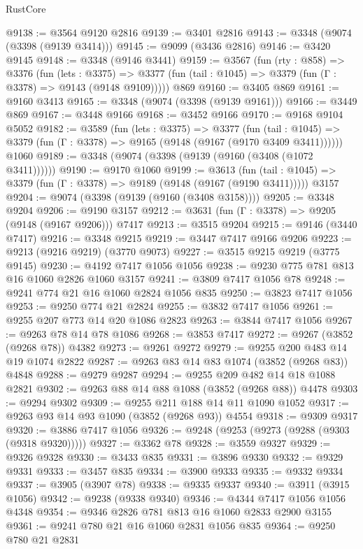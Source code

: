 \begin{lexlean}{RustCore}
\begin{coremodule}
@9138 := @3564 @9120 @2816
@9139 := @3401 @2816
@9143 := @3348 (@9074 (@3398 (@9139 @3414)))
@9145 := @9099 (@3436 @2816)
@9146 := @3420 @9145
@9148 := @3348 (@9146 @3441)
@9159 := @3567
    (fun (rty : @858) =>
    @3376
      (fun (lets : @3375) =>
      @3377 (fun (tail : @1045) => @3379 (fun (Γ : @3378) => @9143 (@9148 @9109)))))
    @869
@9160 := @3405 @869
@9161 := @9160 @3413
@9165 := @3348 (@9074 (@3398 (@9139 @9161)))
@9166 := @3449 @869
@9167 := @3448 @9166
@9168 := @3452 @9166
@9170 := @9168 @9104 @5052
@9182 := @3589
    (fun (lets : @3375) =>
    @3377
      (fun (tail : @1045) => @3379 (fun (Γ : @3378) => @9165 (@9148 (@9167 (@9170 @3409 @3411))))))
    @1060
@9189 := @3348 (@9074 (@3398 (@9139 (@9160 (@3408 (@1072 @3411))))))
@9190 := @9170 @1060
@9199 := @3613
    (fun (tail : @1045) => @3379 (fun (Γ : @3378) => @9189 (@9148 (@9167 (@9190 @3411)))))
    @3157
@9204 := @9074 (@3398 (@9139 (@9160 (@3408 @3158))))
@9205 := @3348 @9204
@9206 := @9190 @3157
@9212 := @3631 (fun (Γ : @3378) => @9205 (@9148 (@9167 @9206))) @7417
@9213 := @3515 @9204
@9215 := @9146 (@3440 @7417)
@9216 := @3348 @9215
@9219 := @3447 @7417 @9166 @9206
@9223 := @9213 (@9216 @9219) (@3770 @9073)
@9227 := @3515 @9215 @9219 (@3775 @9145)
@9230 := @4192 @7417 @1056 @1056
@9238 := @9230 @775 @781 @813 @16 @1060 @2826 @1060 @3157
@9241 := @3809 @7417 @1056 @78
@9248 := @9241 @774 @21 @16 @1060 @2824 @1056 @835
@9250 := @3823 @7417 @1056
@9253 := @9250 @774 @21 @2824
@9255 := @3832 @7417 @1056
@9261 := @9255 @207 @773 @14 @20 @1086 @2823
@9263 := @3844 @7417 @1056
@9267 := @9263 @78 @14 @78 @1086
@9268 := @3853 @7417
@9272 := @9267 (@3852 (@9268 @78)) @4382
@9273 := @9261 @9272
@9279 := @9255 @200 @483 @14 @19 @1074 @2822
@9287 := @9263 @83 @14 @83 @1074 (@3852 (@9268 @83)) @4848
@9288 := @9279 @9287
@9294 := @9255 @209 @482 @14 @18 @1088 @2821
@9302 := @9263 @88 @14 @88 @1088 (@3852 (@9268 @88)) @4478
@9303 := @9294 @9302
@9309 := @9255 @211 @188 @14 @11 @1090 @1052
@9317 := @9263 @93 @14 @93 @1090 (@3852 (@9268 @93)) @4554
@9318 := @9309 @9317
@9320 := @3886 @7417 @1056
@9326 := @9248 (@9253 (@9273 (@9288 (@9303 (@9318 @9320)))))
@9327 := @3362 @78
@9328 := @3559 @9327
@9329 := @9326 @9328
@9330 := @3433 @835
@9331 := @3896 @9330
@9332 := @9329 @9331
@9333 := @3457 @835
@9334 := @3900 @9333
@9335 := @9332 @9334
@9337 := @3905 (@3907 @78)
@9338 := @9335 @9337
@9340 := @3911 (@3915 @1056)
@9342 := @9238 (@9338 @9340)
@9346 := @4344 @7417 @1056 @1056 @4348
@9354 := @9346 @2826 @781 @813 @16 @1060 @2833 @2900 @3155
@9361 := @9241 @780 @21 @16 @1060 @2831 @1056 @835
@9364 := @9250 @780 @21 @2831

\end{coremodule}
\end{lexlean}
